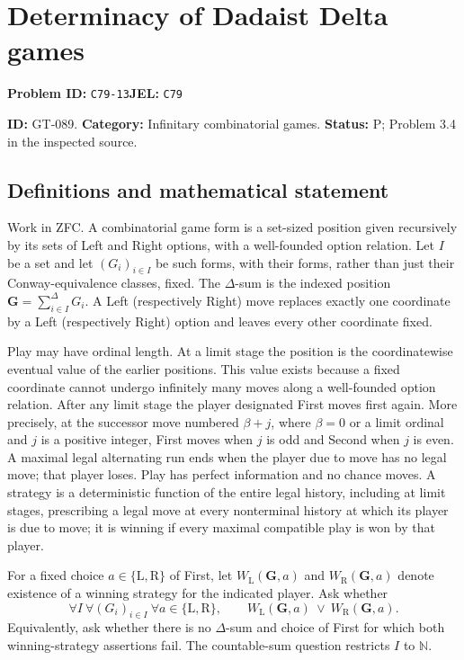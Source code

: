 \documentclass[11pt,a4paper]{article}
\begin{document}
\section*{Determinacy of Dadaist Delta games}
\textbf{Problem ID:} \texttt{C79-13}\quad \textbf{JEL:} \texttt{C79}\par
\label{problem:OP-0219}
\label{game:GT-089}
{\sffamily\small\color{muted}
\noindent\textbf{ID:} GT-089. \textbf{Category:} Infinitary combinatorial games.
\textbf{Status:} P; Problem 3.4 in the inspected source.
\par}
\subsection*{Definitions and mathematical statement}
Work in ZFC. A combinatorial game form is a set-sized position given recursively by its sets of Left and Right options, with a well-founded option relation. Let $I$ be a set and let $(G_i)_{i\in I}$ be such forms, with their forms, rather than just their Conway-equivalence classes, fixed. The $\Delta$-sum is the indexed position
$\mathbf G=\sum_{i\in I}^{\Delta}G_i$. A Left (respectively Right) move replaces exactly one coordinate by a Left (respectively Right) option and leaves every other coordinate fixed.

Play may have ordinal length. At a limit stage the position is the coordinatewise eventual value of the earlier positions. This value exists because a fixed coordinate cannot undergo infinitely many moves along a well-founded option relation. After any limit stage the player designated First moves first again. More precisely, at the successor move numbered $\beta+j$, where $\beta=0$ or a limit ordinal and $j$ is a positive integer, First moves when $j$ is odd and Second when $j$ is even. A maximal legal alternating run ends when the player due to move has no legal move; that player loses. Play has perfect information and no chance moves. A strategy is a deterministic function of the entire legal history, including at limit stages, prescribing a legal move at every nonterminal history at which its player is due to move; it is winning if every maximal compatible play is won by that player.

For a fixed choice $a\in\{\mathrm L,\mathrm R\}$ of First, let
$W_{\mathrm L}(\mathbf G,a)$ and $W_{\mathrm R}(\mathbf G,a)$ denote existence of a winning strategy for the indicated player. Ask whether
\[
 \forall I\ \forall (G_i)_{i\in I}\ \forall a\in\{\mathrm L,\mathrm R\},
 \qquad W_{\mathrm L}(\mathbf G,a)\ \lor\ W_{\mathrm R}(\mathbf G,a).
\]
Equivalently, ask whether there is no $\Delta$-sum and choice of First for which both winning-strategy assertions fail. The countable-sum question restricts $I$ to $\mathbb N$.
\end{document}
